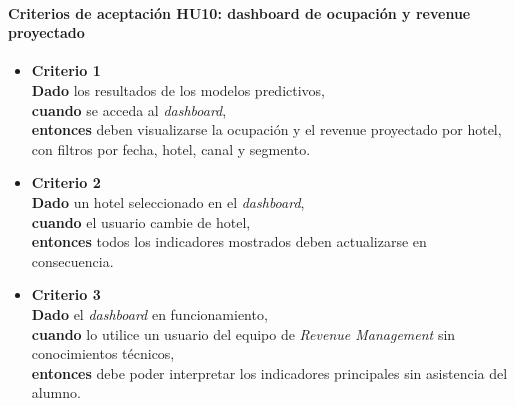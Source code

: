 \documentclass[
11pt, %
]{charter}
\begin{document}
\paragraph{Criterios de aceptación HU10: dashboard de ocupación y revenue proyectado}
\begin{itemize}
  \item \textbf{Criterio 1} \\
  \textbf{Dado} los resultados de los modelos predictivos, \\
  \textbf{cuando} se acceda al \textit{dashboard}, \\
  \textbf{entonces} deben visualizarse la ocupación y el revenue proyectado por hotel, con filtros por fecha, hotel, canal y segmento.

  \item \textbf{Criterio 2} \\
  \textbf{Dado} un hotel seleccionado en el \textit{dashboard}, \\
  \textbf{cuando} el usuario cambie de hotel, \\
  \textbf{entonces} todos los indicadores mostrados deben actualizarse en consecuencia.

  \item \textbf{Criterio 3} \\
  \textbf{Dado} el \textit{dashboard} en funcionamiento, \\
  \textbf{cuando} lo utilice un usuario del equipo de \textit{Revenue Management} sin conocimientos técnicos, \\
  \textbf{entonces} debe poder interpretar los indicadores principales sin asistencia del alumno.
\end{itemize}

\vspace{1em}
\end{document}
